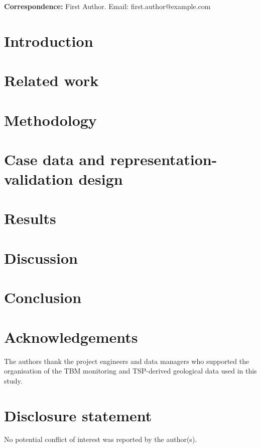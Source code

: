 \documentclass{tGIS2e}
\newcommand{\correspondence}[1]{\par\noindent\textbf{Correspondence:} #1}
\begin{document}
\ifijgisclass\else
\correspondence{First Author. Email: first.author@example.com}
\fi

\section{Introduction}


\section{Related work}


\section{Methodology}


\section{Case data and representation-validation design}


\section{Results}


\section{Discussion}


\section{Conclusion}


\section*{Acknowledgements}
The authors thank the project engineers and data managers who supported the organisation of the TBM monitoring and TSP-derived geological data used in this study.

\section*{Disclosure statement}
No potential conflict of interest was reported by the author(s).
\end{document}
